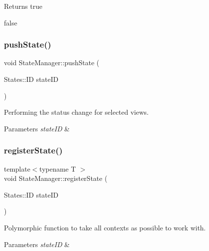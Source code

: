 \begin{DoxyReturn}{Returns}
true 

false 
\end{DoxyReturn}
\mbox{\label{classStateManager_a4f0c970f9f5cdee29b16b1bc50614180}} 
\subsubsection{\texorpdfstring{push\+State()}{pushState()}}
{\footnotesize\ttfamily void State\+Manager\+::push\+State (\begin{DoxyParamCaption}\item[{States\+::\+ID}]{state\+ID }\end{DoxyParamCaption})}



Performing the status change for selected views. 


\begin{DoxyParams}{Parameters}
{\em state\+ID} & \\
\hline
\end{DoxyParams}
\mbox{\label{classStateManager_a82f1a73f868174c930eb3d254b4eb7bb}} 
\subsubsection{\texorpdfstring{register\+State()}{registerState()}}
{\footnotesize\ttfamily template$<$typename T $>$ \\
void State\+Manager\+::register\+State (\begin{DoxyParamCaption}\item[{States\+::\+ID}]{state\+ID }\end{DoxyParamCaption})}



Polymorphic function to take all contexts as possible to work with. 


\begin{DoxyParams}{Parameters}
{\em state\+ID} & \\
\hline
\end{DoxyParams}
\mbox{\label{classStateManager_a07b3a4d61e0f75fc6c8730f9f77449a4}} 
